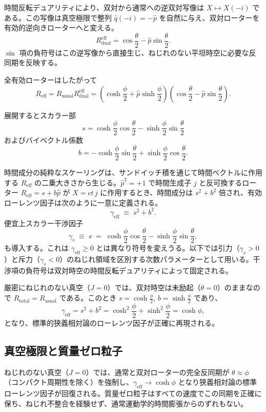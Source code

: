 \documentclass[a4paper]{article}
\begin{document}
時間反転デュアリティにより、双対から通常への逆双対写像は $X \mapsto X(-i)$ である。この写像は真空極限で整列 $\hat{q} (-i) = -\hat{p}$ を自然に与え、双対ローターを有効的逆向きローターへと変える。
\[
R_\text{dual}^\text{eff} = \cos\frac{\theta}{2} - \hat{p} \sin\frac{\theta}{2}.
\]
$\sin$ 項の負符号はこの逆写像から直接生じ、ねじれのない平坦時空に必要な反同期を反映する。

全有効ローターはしたがって
\[
R_\text{eff} = R_\text{usual} R_\text{dual}^\text{eff} = \left( \cosh\frac{\phi}{2} + \hat{p} \sinh\frac{\phi}{2} \right) \left( \cos\frac{\theta}{2} - \hat{p} \sin\frac{\theta}{2} \right).
\]

展開するとスカラー部
\[
s = \cosh\frac{\phi}{2} \cos\frac{\theta}{2} - \sinh\frac{\phi}{2} \sin\frac{\theta}{2}
\]
およびバイベクトル係数
\[
b = -\cosh\frac{\phi}{2} \sin\frac{\theta}{2} + \sinh\frac{\phi}{2} \cos\frac{\theta}{2}.
\]

時間成分の純粋なスケーリングは、サンドイッチ積を通じて時間ベクトルに作用する $R_\text{eff}$ の二乗大きさから生じる。$\hat{p}^2 = +1$ で時間生成子 $j$ と反可換するローター $R_\text{eff} = s + b\hat{p}$ が $X = ct\, j$ に作用するとき、時間成分は $s^2 + b^2$ 倍され、有効ローレンツ因子は次のように一意に定義される。
\[
\gamma_\text{eff} \;\equiv\; s^2 + b^2.
\]
便宜上スカラー干渉因子
\[
\gamma_s \;\equiv\; s \;=\; \cosh\frac{\phi}{2} \cos\frac{\theta}{2} - \sinh\frac{\phi}{2} \sin\frac{\theta}{2},
\]
も導入する。これは $\gamma_\text{eff}\geq 0$ とは異なり符号を変えうる。以下では引力（$\gamma_s > 0$）と斥力（$\gamma_s < 0$）のねじれ領域を区別する次数パラメーターとして用いる。干渉項の負符号は双対時空の時間反転デュアリティによって固定される。

厳密にねじれのない真空（$J=0$）では、双対時空は未励起（$\theta = 0$）のままなので $R_\text{total} = R_\text{usual}$ である。このとき $s = \cosh\frac{\phi}{2}$, $b = \sinh\frac{\phi}{2}$ であり、
\[
\gamma_\text{eff} = s^2 + b^2 = \cosh^2\frac{\phi}{2} + \sinh^2\frac{\phi}{2} = \cosh\phi,
\]
となり、標準的狭義相対論のローレンツ因子が正確に再現される。

\subsection{真空極限と質量ゼロ粒子}

ねじれのない真空（$J=0$）では、通常と双対ローターの完全反同期が $\theta \approx \phi$（コンパクト周期性を除く）を強制し、$\gamma_{\text{eff}} \to \cosh\phi$ となり狭義相対論の標準ローレンツ因子が回復される。質量ゼロ粒子はすべての速度でこの同期を正確に保ち、ねじれ不整合を経験せず、通常運動学的時間膨張からのずれもない。
\end{document}
